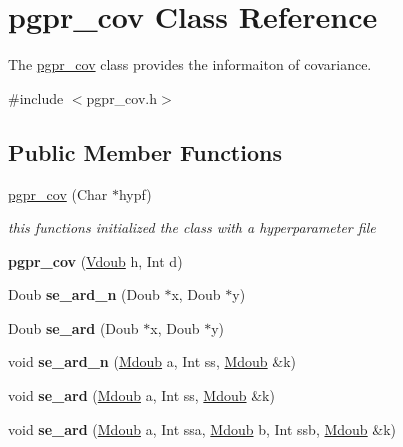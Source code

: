 \hypertarget{classpgpr__cov}{\section{pgpr\-\_\-cov Class Reference}
\label{classpgpr__cov}
}


The \hyperlink{classpgpr__cov}{pgpr\-\_\-cov} class provides the informaiton of covariance.  




{\ttfamily \#include $<$pgpr\-\_\-cov.\-h$>$}

\subsection*{Public Member Functions}
\begin{DoxyCompactItemize}
\item 
\hyperlink{classpgpr__cov_addb951bbf66b46728f94c6fab2d9b39a}{pgpr\-\_\-cov} (Char $\ast$hypf)
\begin{DoxyCompactList}\small\item\em this functions initialized the class with a hyperparameter file \end{DoxyCompactList}\item 
\hypertarget{classpgpr__cov_a0ba2630a7eed0d61906c8e61123e1cac}{{\bfseries pgpr\-\_\-cov} (\hyperlink{classpgpr__vector}{Vdoub} h, Int d)}\label{classpgpr__cov_a0ba2630a7eed0d61906c8e61123e1cac}

\item 
\hypertarget{classpgpr__cov_ae2469b35694cba21322dd68fe3a40699}{Doub {\bfseries se\-\_\-ard\-\_\-n} (Doub $\ast$x, Doub $\ast$y)}\label{classpgpr__cov_ae2469b35694cba21322dd68fe3a40699}

\item 
\hypertarget{classpgpr__cov_a54035854a07e73b7b19570e65b44beb7}{Doub {\bfseries se\-\_\-ard} (Doub $\ast$x, Doub $\ast$y)}\label{classpgpr__cov_a54035854a07e73b7b19570e65b44beb7}

\item 
\hypertarget{classpgpr__cov_ad9a0e147071aab11d5ebaa6d6ced36a3}{void {\bfseries se\-\_\-ard\-\_\-n} (\hyperlink{classpgpr__matrix}{Mdoub} a, Int ss, \hyperlink{classpgpr__matrix}{Mdoub} \&k)}\label{classpgpr__cov_ad9a0e147071aab11d5ebaa6d6ced36a3}

\item 
\hypertarget{classpgpr__cov_af38ac241d313217e1ffe649a8f1fcfd5}{void {\bfseries se\-\_\-ard} (\hyperlink{classpgpr__matrix}{Mdoub} a, Int ss, \hyperlink{classpgpr__matrix}{Mdoub} \&k)}\label{classpgpr__cov_af38ac241d313217e1ffe649a8f1fcfd5}

\item 
\hypertarget{classpgpr__cov_a041ee6574fd91bd9f22c98878e758163}{void {\bfseries se\-\_\-ard} (\hyperlink{classpgpr__matrix}{Mdoub} a, Int ssa, \hyperlink{classpgpr__matrix}{Mdoub} b, Int ssb, \hyperlink{classpgpr__matrix}{Mdoub} \&k)}\label{classpgpr__cov_a041ee6574fd91bd9f22c98878e758163}

\end{DoxyCompactItemize}

